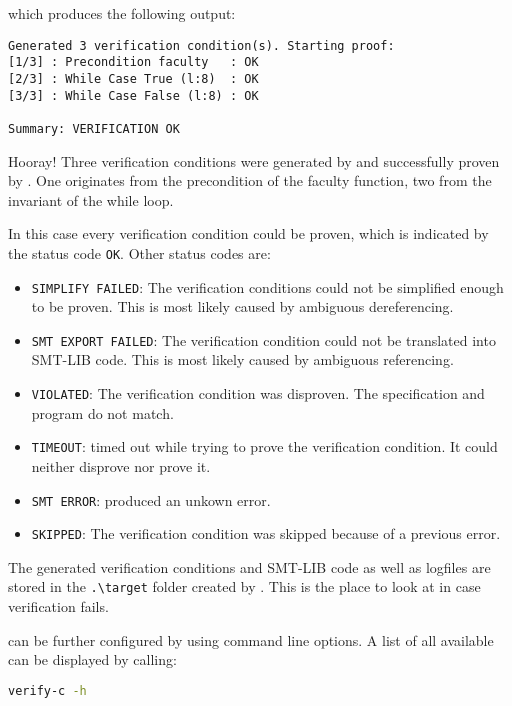 \documentclass[12pt]{article}
\begin{document}
which produces the following output:

\begin{lstlisting}[style=cmd]
Generated 3 verification condition(s). Starting proof:
[1/3] : Precondition faculty   : OK
[2/3] : While Case True (l:8)  : OK
[3/3] : While Case False (l:8) : OK

Summary: VERIFICATION OK
\end{lstlisting}

Hooray! Three verification conditions were generated by \verifyc and successfully proven by \zthree. 
One originates from the precondition of the faculty function, two from the invariant of the while loop.

In this case every verification condition could be proven, which is indicated by the status code \texttt{OK}.
Other status codes are:


\begin{itemize}
    \item \texttt{SIMPLIFY FAILED}: The verification conditions could not be simplified enough to be proven. This is most likely caused by ambiguous dereferencing.
    \item \texttt{SMT EXPORT FAILED}: The verification condition could not be translated into SMT-LIB code. This is most likely caused by ambiguous referencing.
    \item \texttt{VIOLATED}: The verification condition was disproven. The specification and program do not match.
    \item \texttt{TIMEOUT}: \zthree timed out while trying to prove the verification condition. It could neither disprove nor prove it.
    \item \texttt{SMT ERROR}: \zthree produced an unkown error.
    \item \texttt{SKIPPED}: The verification condition was skipped because of a previous error.
\end{itemize}

The generated verification conditions and SMT-LIB code as well as logfiles are stored in the \texttt{.\textbackslash target} folder created by \verifyc.
This is the place to look at in case verification fails.

\verifyc can be further configured by using command line options. 
A list of all available can be displayed by calling:

\begin{lstlisting}[language=bash]
    verify-c -h
\end{lstlisting}
\end{document}
